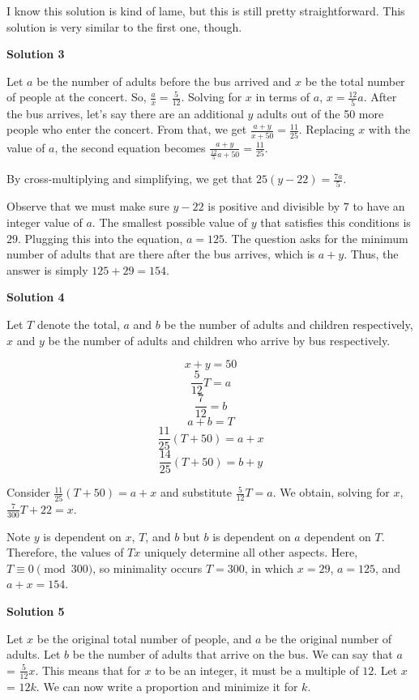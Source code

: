 \begin{enumerate}
 I know this solution is kind of lame, but this is still pretty straightforward. This solution is very similar to the first one, though.

 



\textbf{Solution 3}

Let $a$ be the number of adults before the bus arrived and $x$ be the total number of people at the concert. So, $\frac{a}{x}=\frac{5}{12}$. Solving for $x$ in terms of $a$, $x = \frac{12}{5}a$. After the bus arrives, let's say there are an additional $y$ adults out of the 50 more people who enter the concert. From that, we get $\frac{a+y}{x+50}=\frac{11}{25}$. Replacing $x$ with the value of $a$, the second equation becomes $\frac{a+y}{\frac{12}{5}a+50}=\frac{11}{25}$.

 By cross-multiplying and simplifying, we get that $25(y-22)=\frac{7a}{5}$.

 Observe that we must make sure $y-22$ is positive and divisible by $7$ to have an integer value of $a$. The smallest possible value of $y$ that satisfies this conditions is $29$. Plugging this into the equation, $a = 125$. The question asks for the minimum number of adults that are there after the bus arrives, which is $a+y$. Thus, the answer is simply $125+29=\boxed{154}$.

 



\textbf{Solution 4}

Let $T$ denote the total, $a$ and $b$ be the number of adults and children respectively, $x$ and $y$ be the number of adults and children who arrive by bus respectively.

 
 \[x+y=50\]
 \[\frac{5}{12}T = a\]
 \[\frac{7}{12} = b\]
 \[a+b = T\]
 \[\frac{11}{25}(T+50) = a+x\]
 \[\frac{14}{25} (T+50) = b+y\]

 Consider $\frac{11}{25}(T+50) = a+x$ and substitute $\frac{5}{12}T = a$. We obtain, solving for $x$, $\frac{7}{300}T + 22 = x$.

 Note $y$ is dependent on $x$, $T$, and $b$ but $b$ is dependent on $a$ dependent on $T$. Therefore, the values of $T x$ uniquely determine all other aspects. Here, $T \equiv 0 \pmod{300}$, so minimality occurs $T = 300$, in which $x = 29$, $a = 125$, and $a+x = \boxed{154}$.

 



\textbf{Solution 5}

Let $x$ be the original total number of people, and $a$ be the original number of adults. Let $b$ be the number of adults that arrive on the bus. We can say that $a$ = $\frac{5}{12}x$. This means that for $x$ to be an integer, it must be a multiple of $12$. Let $x$ = $12k$. We can now write a proportion and minimize it for $k$. 


\end{enumerate}
